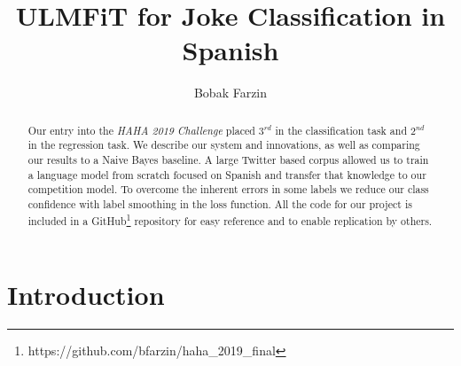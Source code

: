 \documentclass[runningheads]{llncs}
\begin{document}
\title{ULMFiT for Joke Classification in Spanish}

\author{Bobak Farzin}
%
%


\maketitle

\begin{abstract}
Our entry into the \textit{HAHA 2019 Challenge} placed $3^{rd}$ in the classification task and $2^{nd}$ in the regression task.  We describe our system and innovations, as well as comparing our results to a Naive Bayes baseline.
A large Twitter based corpus allowed us to train a language model from scratch focused on Spanish and transfer that knowledge to our competition model.  To overcome the inherent errors in some labels we reduce our class confidence with label smoothing in the loss function.
All the code for our project is included in a GitHub\footnote{https://github.com/bfarzin/haha\_2019\_final} repository for easy reference and to enable replication by others.

\end{abstract}

\section{Introduction}
\label{intro}
\newcommand{\chapquote}[3]{\begin{quotation} \textit{#1} \end{quotation} \begin{flushright} - #2, \textit{#3}\end{flushright} }
\end{document}
